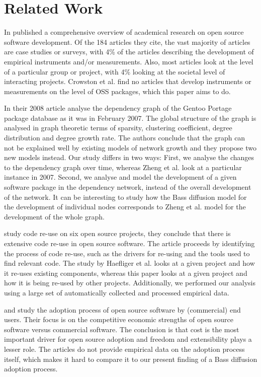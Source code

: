 \documentclass[smallextended,final]{svjour3}
\begin{document}
\section{Related Work}

In \citet{crowston08} published a comprehensive overview of academical research on open source software development. Of the 184 articles they cite, the vast majority of articles are case studies or surveys, with 4\% of the articles describing the development of empirical instruments and/or measurements. Also, most articles look at the level of a particular group or project, with 4\% looking at the societal level of interacting projects. Crowston et al. find no articles that develop instruments or measurements on the level of OSS packages, which this paper aims to do.

In their 2008 article \citet{zheng08} analyse the dependency graph of the Gentoo Portage package database as it was in February 2007. The global structure of the graph is analysed in graph theoretic terms of sparsity, clustering coefficient, degree distribution and degree growth rate. The authors conclude that the graph can not be explained well by existing models of network growth and they propose two new models instead. Our study differs in two ways: First, we analyse the changes to the dependency graph over time, whereas Zheng et al. look at a particular instance in 2007. Second, we analyse and model the development of a given software package in the dependency network, instead of the overall development of the network. It can be interesting to study how the Bass diffusion model for the development of individual nodes corresponds to Zheng et al. model for the development of the whole graph.

\citet{haefliger08} study code re-use on six open source projects, they conclude that there is extensive code re-use in open source software. The article proceeds by identifying the process of code re-use, such as the drivers for re-using and the tools used to find relevant code. The study by Haefliger et al. looks at a given project and how it  re-uses existing components, whereas this paper looks at a given project and how it is being re-used by other projects. Additionally, we performed our analysis using a large set of automatically collected and processed empirical data.

\citet{dedrick04} and \citet{chen06} study the adoption process of open source software by (commercial) end users. Their focus is on the competitive economic strengths of open source software versus commercial software. The conclusion is that cost is the most important driver for open source adoption and freedom and extensibility plays a lesser role. The articles do not provide empirical data on the adoption process itself, which makes it hard to compare it to our present finding of a Bass diffusion adoption process.
\end{document}

